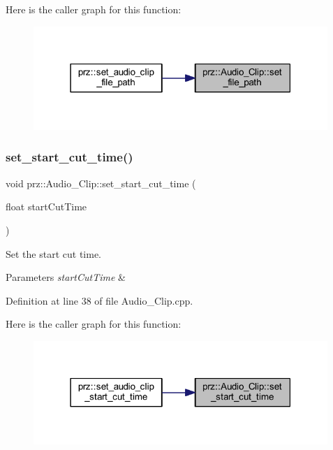 Here is the caller graph for this function\+:
\nopagebreak
\begin{figure}[H]
\begin{center}
\leavevmode
\includegraphics[width=316pt]{classprz_1_1_audio___clip_aa098aaf21788bfdf5410cb1895566391_icgraph}
\end{center}
\end{figure}
\mbox{\label{classprz_1_1_audio___clip_ae2daaa8e064720fdecf051c63660edd5}} 
\subsubsection{\texorpdfstring{set\_start\_cut\_time()}{set\_start\_cut\_time()}}
{\footnotesize\ttfamily void prz\+::\+Audio\+\_\+\+Clip\+::set\+\_\+start\+\_\+cut\+\_\+time (\begin{DoxyParamCaption}\item[{float}]{start\+Cut\+Time }\end{DoxyParamCaption})}



Set the start cut time. 


\begin{DoxyParams}{Parameters}
{\em start\+Cut\+Time} & \\
\hline
\end{DoxyParams}


Definition at line 38 of file Audio\+\_\+\+Clip.\+cpp.

Here is the caller graph for this function\+:
\nopagebreak
\begin{figure}[H]
\begin{center}
\leavevmode
\includegraphics[width=316pt]{classprz_1_1_audio___clip_ae2daaa8e064720fdecf051c63660edd5_icgraph}
\end{center}
\end{figure}
\mbox{\label{classprz_1_1_audio___clip_a15fdef4e8547e25d06785d816be71a12}} 
